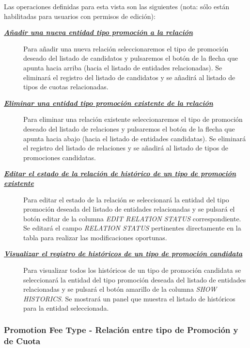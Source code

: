 Las operaciones definidas para esta vista son las siguientes (nota: sólo están habilitadas para usuarios con permisos de edición):
\begin{description}
\item[\underline{\textsl{\textbf{Añadir una nueva entidad tipo promoción a la relación}}}] Para añadir una nueva relación seleccionaremos el tipo de promoción deseado del listado de candidatos y pulsaremos el botón de la flecha que apunta hacia arriba (hacia el listado de entidades relacionadas). Se eliminará el registro del listado de candidatos y se añadirá al listado de tipos de cuotas relacionadas.

\item[\underline{\textsl{\textbf{Eliminar una entidad tipo promoción existente de la relación}}}] Para eliminar una relación existente seleccionaremos el tipo de promoción deseado del listado de relaciones y pulsaremos el botón de la flecha que apunta hacia abajo (hacia el listado de entidades candidatas). Se eliminará el registro del listado de relaciones y se añadirá al listado de tipos de promociones candidatas.

\item[\underline{\textsl{\textbf{Editar el estado de la relación de histórico de un tipo de promoción existente}}}] Para editar el estado de la relación se seleccionará la entidad del tipo promoción  deseada del listado de entidades relacionadas y se pulsará el botón editar de la columna \textit{EDIT RELATION STATUS} correspondiente. Se editará el campo \emph{RELATION STATUS}  pertinentes directamente en la tabla para realizar las modificaciones oportunas.

\item[\underline{\textsl{\textbf{Visualizar el registro de históricos de un tipo de promoción candidata}}}]
Para visualizar todos los históricos de un tipo de promoción candidata se seleccionará la entidad del tipo promoción deseada del listado de entidades relacionadas y se pulsará el botón amarillo de la columna \textit{SHOW HISTORICS}. Se mostrará un panel que muestra el listado de históricos para la entidad seleccionada. 
\end{description}


\subsubsection{Promotion Fee Type - Relación entre tipo de Promoción y de Cuota}
\label{sub:promotion-fee-type-relation}

